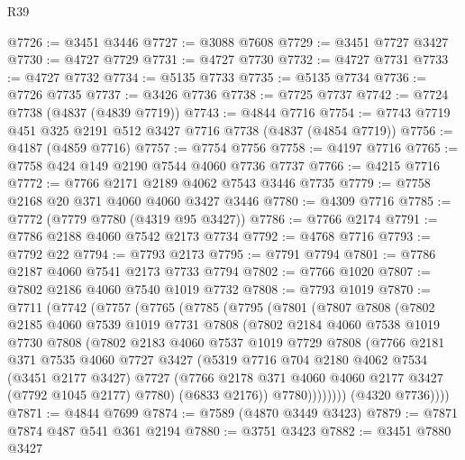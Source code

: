 \begin{lexlean}{R39}
\begin{coremodule}
@7726 := @3451 @3446
@7727 := @3088 @7608
@7729 := @3451 @7727 @3427
@7730 := @4727 @7729
@7731 := @4727 @7730
@7732 := @4727 @7731
@7733 := @4727 @7732
@7734 := @5135 @7733
@7735 := @5135 @7734
@7736 := @7726 @7735
@7737 := @3426 @7736
@7738 := @7725 @7737
@7742 := @7724 @7738 (@4837 (@4839 @7719))
@7743 := @4844 @7716
@7754 := @7743 @7719 @451 @325 @2191 @512 @3427 @7716 @7738 (@4837 (@4854 @7719))
@7756 := @4187 (@4859 @7716)
@7757 := @7754 @7756
@7758 := @4197 @7716
@7765 := @7758 @424 @149 @2190 @7544 @4060 @7736 @7737
@7766 := @4215 @7716
@7772 := @7766 @2171 @2189 @4062 @7543 @3446 @7735
@7779 := @7758 @2168 @20 @371 @4060 @4060 @3427 @3446
@7780 := @4309 @7716
@7785 := @7772 (@7779 @7780 (@4319 @95 @3427))
@7786 := @7766 @2174
@7791 := @7786 @2188 @4060 @7542 @2173 @7734
@7792 := @4768 @7716
@7793 := @7792 @22
@7794 := @7793 @2173
@7795 := @7791 @7794
@7801 := @7786 @2187 @4060 @7541 @2173 @7733 @7794
@7802 := @7766 @1020
@7807 := @7802 @2186 @4060 @7540 @1019 @7732
@7808 := @7793 @1019
@7870 := @7711
    (@7742
      (@7757
        (@7765
          (@7785
            (@7795
              (@7801
                (@7807
                  @7808
                  (@7802
                    @2185
                    @4060
                    @7539
                    @1019
                    @7731
                    @7808
                    (@7802
                      @2184
                      @4060
                      @7538
                      @1019
                      @7730
                      @7808
                      (@7802
                        @2183
                        @4060
                        @7537
                        @1019
                        @7729
                        @7808
                        (@7766
                          @2181
                          @371
                          @7535
                          @4060
                          @7727
                          @3427
                          (@5319
                            @7716
                            @704
                            @2180
                            @4062
                            @7534
                            (@3451 @2177 @3427)
                            @7727
                            (@7766 @2178 @371 @4060 @4060 @2177 @3427 (@7792 @1045 @2177) @7780)
                            (@6833 @2176))
                          @7780))))))))
          (@4320 @7736))))
@7871 := @4844 @7699
@7874 := @7589 (@4870 @3449 @3423)
@7879 := @7871 @7874 @487 @541 @361 @2194
@7880 := @3751 @3423
@7882 := @3451 @7880 @3427

\end{coremodule}
\end{lexlean}
